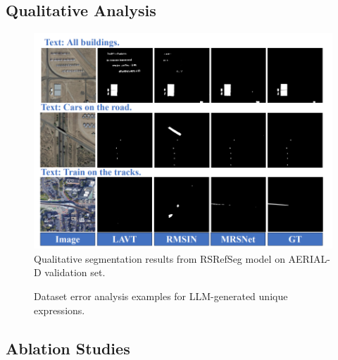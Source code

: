 \subsection{Qualitative Analysis}

\begin{figure}[H]
\centering
\includegraphics[width=\textwidth]{qualitative.png}
\caption{Qualitative segmentation results from RSRefSeg model on AERIAL-D validation set.}
\label{fig:qualitative_examples}
\end{figure}

\begin{figure}[H]
\centering
\caption{Dataset error analysis examples for LLM-generated unique expressions.}
\label{fig:dataset_errors}
\end{figure}

\subsection{Ablation Studies}

\begin{table}[H]
\centering
\caption{Ablation Study: Expression Type Training Analysis}
\label{tab:ablation_expression_types}
\end{table}



